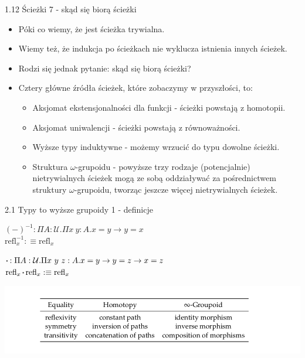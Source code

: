 \documentclass{beamer}
\newcommand{\U}{\mathcal{U}}
\newcommand{\refl}[1]{\text{refl}_{#1}}
\newcommand*\sq{\mathbin{\vcenter{\hbox{\rule{.3ex}{.3ex}}}}}
\begin{document}
\begin{frame}{1.12 Ścieżki 7 - skąd się biorą ścieżki}
\begin{itemize}
	\item Póki co wiemy, że jest ścieżka trywialna.
	\item Wiemy też, że indukcja po ścieżkach nie wyklucza istnienia innych ścieżek.
	\item Rodzi się jednak pytanie: skąd się biorą ścieżki?
	\item Cztery główne źródła ścieżek, które zobaczymy w przyszłości, to:
	\begin{itemize}
		\item Aksjomat ekstensjonalności dla funkcji - ścieżki powstają z homotopii.
		\item Aksjomat uniwalencji - ścieżki powstają z równoważności.
		\item Wyższe typy induktywne - możemy wrzucić do typu dowolne ścieżki.
		\item Struktura $\omega$-grupoidu - powyższe trzy rodzaje (potencjalnie) nietrywialnych ścieżek mogą ze sobą oddziaływać za pośrednictwem struktury $\omega$-grupoidu, tworząc jeszcze więcej nietrywialnych ścieżek. 
	\end{itemize}
\end{itemize}
\end{frame}

\begin{frame}{2.1 Typy to wyższe grupoidy 1 - definicje}

\begin{definition}
$(-)^{-1} : \Pi A : \U. \Pi x\ y : A. x = y \to y = x$ \\
$\refl{x}^{-1} :\equiv \refl{x}$
\end{definition}

\begin{definition}
$\sq : \Pi A : \U. \Pi x\ y\ z : A. x = y \to y = z \to x = z$ \\
$\refl{x} \sq \refl{x} :\equiv \refl{x}$
\end{definition}

\includegraphics[scale=0.3]{EqPathGrupoid.png}

\end{frame}
\end{document}
